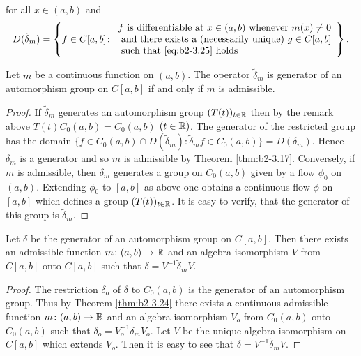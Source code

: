 for all $x \in (a,b)$ and 
\[
D(\tilde{\delta}_{m}) = \left\{ f \in C[a,b] \colon 
\begin{array}{l}
f \text{ is differentiable at } x \in (a,b) \text{ whenever } m(x) \neq 0 \\ 
\text{ and there exists a (necessarily unique) } g \in C[a,b] \\
\text{ such that \eqref{eq:b2-3.25} holds} 
\end{array} \right\}.
\]
\begin{theorem}\label{thm:b2-3.26}
Let $m$ be a continuous function on $(a,b)$.
The operator $\tilde{\delta}_{m}$ is generator of an automorphism group on $C[a,b]$ if and only if $m$ is admissible.
\end{theorem}
\begin{proof}
If $\tilde{\delta}_{m}$ generates an automorphism group $(T(t))_{t \in \mathbb{R}}$ then by the remark above $T(t)C_{0}(a,b) = C_{0}(a,b)$ $(t \in \mathbb{R})$.
The generator of the restricted group has the domain $\{ f \in C_{0}(a,b) \cap D(\tilde{\delta}_{m}) \colon \tilde{\delta}_{m}f \in C_{0}(a,b) \} = D(\delta_{m})$.
Hence $\delta_{m}$ is a generator and so $m$ is admissible by Theorem \ref{thm:b2-3.17}.
Conversely, if $m$ is admissible, then $\delta_{m}$ generates a group on $C_{0}(a,b)$ given by a flow $\phi_{0}$ on $(a,b)$.
Extending $\phi_{0}$ to $[a,b]$ as above one obtains a continuous flow $\phi$ on $[a,b]$ which defines a group $(T(t))_{t \in \mathbb{R}}$.
It is easy to verify, that the generator of this group is $\tilde{\delta}_{m}$.
\end{proof}
\begin{theorem}\label{thm:b2-3.27}
Let $\delta$ be the generator of an automorphism group on $C[a,b]$.
Then there exists an admissible function $m \colon (a,b) \to \mathbb{R}$ and an algebra isomorphism $V$ from $C[a,b]$ onto $C[a,b]$ such that $\delta = V^{-1}\tilde{\delta}_{m}V$.
\end{theorem}
\begin{proof}
The restriction $\delta_{o}$ of $\delta$ to $C_{0}(a,b)$ is the generator of an automorphism group.
Thus by Theorem \ref{thm:b2-3.24} there exists a continuous admissible function $m \colon (a,b) \to \mathbb{R}$ and an algebra isomorphism $V_{o}$ from $C_{0}(a,b)$ onto $C_{0}(a,b)$ such that $\delta_{o} = V_{o}^{-1}\delta_{m}V_{o}$.
Let $V$ be the unique algebra isomorphism on $C[a,b]$ which extends $V_{o}$.
Then it is easy to see that $\delta = V^{-1}\tilde{\delta}_{m}V$.
\end{proof}
